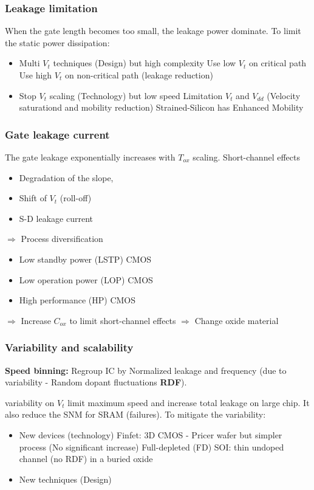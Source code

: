 \subsubsection{Leakage limitation}
When the gate length becomes too small, the leakage power dominate. To limit the static power dissipation:
\begin{itemize}
  \item Multi \(V_t\) techniques (Design) but high complexity
  \subitem Use low \(V_t\) on critical path
  \subitem Use high \(V_t\) on non-critical path (leakage reduction)
  \item Stop \(V_t\) scaling (Technology) but low speed
    \subitem Limitation \(V_t\) and \(V_{dd}\) (Velocity saturationd and mobility reduction)
    \subitem Strained-Silicon has Enhanced Mobility
\end{itemize}

\subsubsection{Gate leakage current}
The gate leakage exponentially increases with \(T_{ox}\) scaling. Short-channel effects
  \begin{itemize}
  \item Degradation of the slope,
  \item Shift of \(V_t\) (roll-off)
  \item S-D leakage current
  \end{itemize}

  \(\Rightarrow\) Process diversification
  \begin{itemize}
    \item Low standby power (LSTP) CMOS
    \item Low operation power (LOP) CMOS
    \item High performance (HP) CMOS
  \end{itemize}


  \(\Rightarrow\) Increase \(C_{ox}\) to limit short-channel effects \(\Rightarrow\) Change oxide material


\subsubsection{Variability and scalability}
\textbf{Speed binning:} Regroup IC by Normalized leakage and frequency (due to variability - Random dopant fluctuations \textbf{RDF}).

variability on \(V_t\) limit maximum speed and increase total leakage on large chip. It also reduce the SNM for SRAM (failures). To mitigate the variability:
\begin{itemize}
  \item New devices (technology)
    \subitem Finfet: 3D CMOS - Pricer wafer but simpler process (No significant increase)
    \subitem Full-depleted (FD) SOI: thin undoped channel (no RDF) in a buried oxide
  \item New techniques (Design)
\end{itemize}


